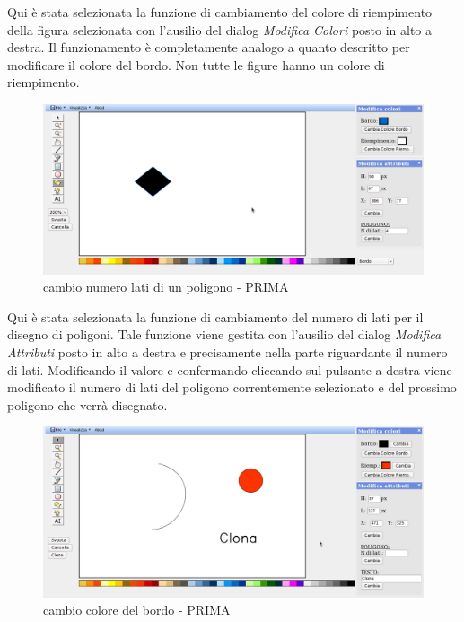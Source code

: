\vspace{100pt}
Qui \`e stata selezionata la funzione di cambiamento del colore di riempimento della figura selezionata con l'ausilio del dialog \textit{Modifica Colori} posto in alto a destra. Il funzionamento \`e completamente analogo a quanto descritto per modificare il colore del bordo. Non tutte le figure hanno un colore di riempimento.

\begin{figure}[!ht]
\centering
\includegraphics[scale=0.4]{images/numero_lati_prima.png}
\caption{cambio numero lati di un poligono  - PRIMA}
\end{figure} 


\vspace{100pt}
Qui \`e stata selezionata la funzione di cambiamento del numero di lati per il disegno di poligoni. Tale funzione viene gestita con l'ausilio del dialog \textit{Modifica Attributi} posto in alto a destra e precisamente nella parte riguardante il numero di lati. Modificando il valore e confermando cliccando sul pulsante a destra viene modificato il numero di lati del poligono correntemente selezionato e del prossimo poligono che verr\`a disegnato. \\

\begin{figure}[!ht]
\centering
\includegraphics[scale=0.4]{images/clona.png}
\caption{cambio colore del bordo  - PRIMA}
\end{figure} 

